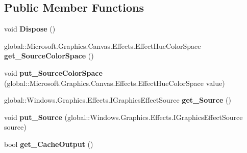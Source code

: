\subsection*{Public Member Functions}
\begin{DoxyCompactItemize}
\item 
\mbox{\label{class_microsoft_1_1_graphics_1_1_canvas_1_1_effects_1_1_hue_to_rgb_effect_a1de87a5854a8b08664e699bdce44d1fc}} 
void {\bfseries Dispose} ()
\item 
\mbox{\label{class_microsoft_1_1_graphics_1_1_canvas_1_1_effects_1_1_hue_to_rgb_effect_a4cad75cc3cb61500073d87abf6b91d73}} 
global\+::\+Microsoft.\+Graphics.\+Canvas.\+Effects.\+Effect\+Hue\+Color\+Space {\bfseries get\+\_\+\+Source\+Color\+Space} ()
\item 
\mbox{\label{class_microsoft_1_1_graphics_1_1_canvas_1_1_effects_1_1_hue_to_rgb_effect_a1ec9f6e57b1e6f130048b5332435b209}} 
void {\bfseries put\+\_\+\+Source\+Color\+Space} (global\+::\+Microsoft.\+Graphics.\+Canvas.\+Effects.\+Effect\+Hue\+Color\+Space value)
\item 
\mbox{\label{class_microsoft_1_1_graphics_1_1_canvas_1_1_effects_1_1_hue_to_rgb_effect_a2a74d1b335531e7c117926f1b1f892db}} 
global\+::\+Windows.\+Graphics.\+Effects.\+I\+Graphics\+Effect\+Source {\bfseries get\+\_\+\+Source} ()
\item 
\mbox{\label{class_microsoft_1_1_graphics_1_1_canvas_1_1_effects_1_1_hue_to_rgb_effect_aef045e9ba0ae3122d52fbf1bf96c7fd4}} 
void {\bfseries put\+\_\+\+Source} (global\+::\+Windows.\+Graphics.\+Effects.\+I\+Graphics\+Effect\+Source source)
\item 
\mbox{\label{class_microsoft_1_1_graphics_1_1_canvas_1_1_effects_1_1_hue_to_rgb_effect_ad3d502f76147d1bdc5e19c9aaa8188f1}} 
bool {\bfseries get\+\_\+\+Cache\+Output} ()
\item 

\end{DoxyCompactItemize}

